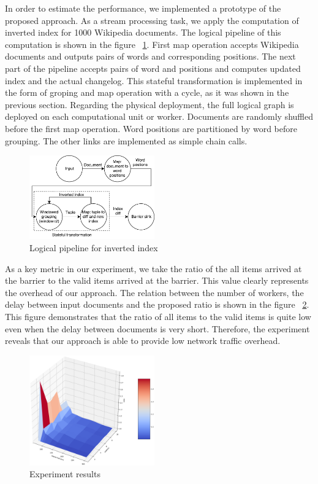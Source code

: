 
\label {fs-experiments}

In order to estimate the performance, we implemented a prototype of the proposed approach. As a stream processing task, we apply the computation of inverted index for 1000 Wikipedia documents. The logical pipeline of this computation is shown in the figure ~\ref{inverted-index}. First map operation accepts Wikipedia documents and outputs pairs of words and corresponding positions. The next part of the pipeline accepts pairs of word and positions and computes updated index and the actual changelog. This stateful transformation is implemented in the form of groping and map operation with a cycle, as it was shown in the previous section. Regarding the physical deployment, the full logical graph is deployed on each computational unit or worker. Documents are randomly shuffled before the first map operation. Word positions are partitioned by word before grouping. The other links are implemented as simple chain calls.

\begin{figure}[htbp]
  \centering
  \includegraphics[width=0.48\textwidth]{pics/inverted-index}
  \caption{Logical pipeline for inverted index}
  \label {inverted-index}
\end{figure}

As a key metric in our experiment, we take the ratio of the all items arrived at the barrier to the valid items arrived at the barrier. This value clearly represents the overhead of our approach. The relation between the number of workers, the delay between input documents and the proposed ratio is shown in the figure ~\ref{experiment}. This figure demonstrates that the ratio of all items to the valid items is quite low even when the delay between documents is very short. Therefore, the experiment reveals that our approach is able to provide low network traffic overhead. 

\begin{figure}[htbp]
  \centering
  \includegraphics[width=0.48\textwidth]{pics/experiment}
  \caption{Experiment results}
  \label {experiment}
\end{figure}
